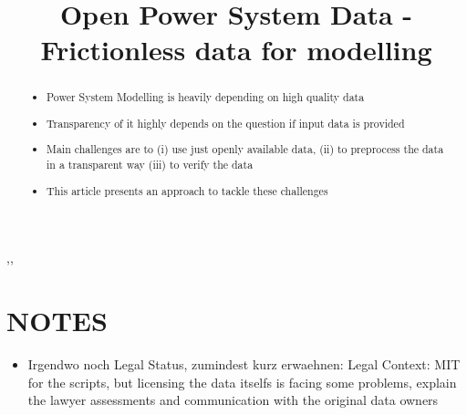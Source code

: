\documentclass[article]{elsarticle}
\begin{document}
\begin{frontmatter}

\title{Open Power System Data - Frictionless data for modelling}
\iffalse
\author{Elsevier\fnref{myfootnote}}
\address{Radarweg 29, Amsterdam}
\fntext[myfootnote]{Since 1880.}


\author[mymainaddress,mysecondaryaddress]{Elsevier Inc}
\ead[url]{www.elsevier.com}

\author[mysecondaryaddress]{Global Customer Service\corref{mycorrespondingauthor}}
\cortext[mycorrespondingauthor]{Corresponding author}
\ead{support@elsevier.com}

\address[mymainaddress]{1600 John F Kennedy Boulevard, Philadelphia}
\address[mysecondaryaddress]{360 Park Avenue South, New York}
\fi
\begin{abstract}
\begin{itemize}
    \item Power System Modelling is heavily depending on high quality data
    \item Transparency of it highly depends on the question if input data is provided
    \item Main challenges are to (i) use just openly available data, (ii) to preprocess the data in a transparent way (iii) to verify the data
     \item This article presents an approach to tackle these challenges
\end{itemize}
\end{abstract}

\begin{keyword}
\sep \sep 
\end{keyword}

\end{frontmatter}

\linenumbers

\section*{NOTES}
\begin{itemize}
    \item Irgendwo noch Legal Status, zumindest kurz erwaehnen: Legal Context: MIT for the scripts, but licensing the data itselfs is facing some problems, explain the lawyer assessments and communication with the original data owners
\end{itemize}
\end{document}
